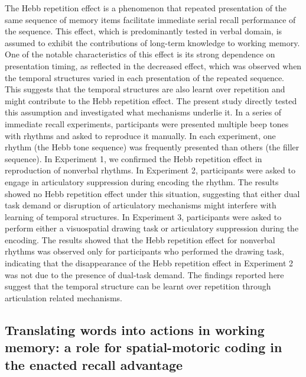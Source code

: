 \documentclass[
  12pt,
]{book}
\begin{document}
The Hebb repetition effect is a phenomenon that repeated presentation of the same sequence of memory items facilitate immediate serial recall performance of the sequence. This effect, which is predominantly tested in verbal domain, is assumed to exhibit the contributions of long-term knowledge to working memory. One of the notable characteristics of this effect is its strong dependence on presentation timing, as reflected in the decreased effect, which was observed when the temporal structures varied in each presentation of the repeated sequence. This suggests that the temporal structures are also learnt over repetition and might contribute to the Hebb repetition effect. The present study directly tested this assumption and investigated what mechanisms underlie it. In a series of immediate recall experiments, participants were presented multiple beep tones with rhythms and asked to reproduce it manually. In each experiment, one rhythm (the Hebb tone sequence) was frequently presented than others (the filler sequence). In Experiment 1, we confirmed the Hebb repetition effect in reproduction of nonverbal rhythms. In Experiment 2, participants were asked to engage in articulatory suppression during encoding the rhythm. The results showed no Hebb repetition effect under this situation, suggesting that either dual task demand or disruption of articulatory mechanisms might interfere with learning of temporal structures. In Experiment 3, participants were asked to perform either a visuospatial drawing task or articulatory suppression during the encoding. The results showed that the Hebb repetition effect for nonverbal rhythms was observed only for participants who performed the drawing task, indicating that the disappearance of the Hebb repetition effect in Experiment 2 was not due to the presence of dual-task demand. The findings reported here suggest that the temporal structure can be learnt over repetition through articulation related mechanisms.

\hypertarget{translating-words-into-actions-in-working-memory-a-role-for-spatial-motoric-coding-in-the-enacted-recall-advantage}{%
\subsection{Translating words into actions in working memory: a role for spatial-motoric coding in the enacted recall advantage}\label{translating-words-into-actions-in-working-memory-a-role-for-spatial-motoric-coding-in-the-enacted-recall-advantage}}
\end{document}
